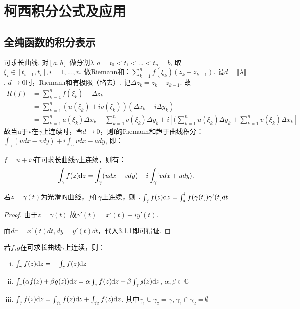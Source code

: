 \chapter{柯西积分公式及应用}

\section{全纯函数的积分表示}
可求长曲线. 对$[a,b]$ 做分割$\lambda : a = t_0 < t_1 < ... < t_n = b$, 取$\xi_i \in [t_{i-1}, t_i], i=1,...,n$.
做Riemann和：$\sum_{k=1} ^{n} f(\xi_k) (z_k - z_{k-1})$. 设$d=\Vert  \lambda \Vert$. $d \rightarrow 0$时，Riemann和有极限（略去）. 记$\Delta z_k = z_k - z_{k-1}$. 故
\begin{align*}
R(f) &= \sum_{k=1}^{n}f(\xi_k) - \Delta z_k \\
&= \sum_{k=1}^{n} (u(\xi_k) + i v(\xi_k))(\Delta x_k + i \Delta y_k) \\
&= \sum_{k=1} ^{n} u(\xi_k) \Delta x_k - \sum_{k=1}^{n} v(\xi_k) \Delta y_k + i [(\sum_{k=1}^{n} u(\xi_k) \Delta y_k + \sum_{k=1}^n v(\xi_k) \Delta x_k]
\end{align*}
故当u于v在$\gamma$上连续时，令$d \rightarrow 0$，则f的Riemann和趋于曲线积分：$\int_{\gamma} (udx - vdy) + i \int_{\gamma}vdx-udy$, 即： 
\begin{theorem}
	$f = u+iv$在可求长曲线$\gamma$上连续，则有：
	$$\int_\gamma f(z) \mathrm{d}z = \int_\gamma (udx-vdy) + i\int_\gamma (vdx+udy).$$
\end{theorem}
\begin{theorem}
	若$z=\gamma(t)$为光滑的曲线，$f$在$\gamma$上连续，则：$\int_\gamma f(z)\mathrm{d}z = \int_a^b f(\gamma(t))\gamma'(t) dt$
\end{theorem}
\begin{proof}
	由于$z=\gamma(t)$ 故$\gamma'(t)=x'(t) + i y'(t)$.
	
	而$dx=x'(t)dt, dy = y'(t)dt$，代入3.1.1即可得证.
\end{proof}

\begin{theorem}
	若$f, g$在可求长曲线$\gamma$上连续，则：
	\begin{enumerate}[i)]
		\item $\int_\gamma f(z)\mathrm{d}z = -\int_\gamma f(z)\mathrm{d}z$
		\item $\int_\gamma (\alpha f(z) + \beta g(z)) \mathrm{d}z = \alpha \int_\gamma f(z) \mathrm{d}z + \beta \int_\gamma g(z) \mathrm{d}z$, \quad $\alpha, \beta \in \mathbb{C}$
		\item $\int_\gamma f(z) \mathrm{d}z = \int_{\gamma_1} f(z) \mathrm{d}z + \int_{\gamma_2} f(z) \mathrm{d}z$. 其中$\gamma_1 \cup \gamma_2 = \gamma$, $\gamma_1 \cap \gamma_2 = \emptyset $
	\end{enumerate}
\end{theorem}

